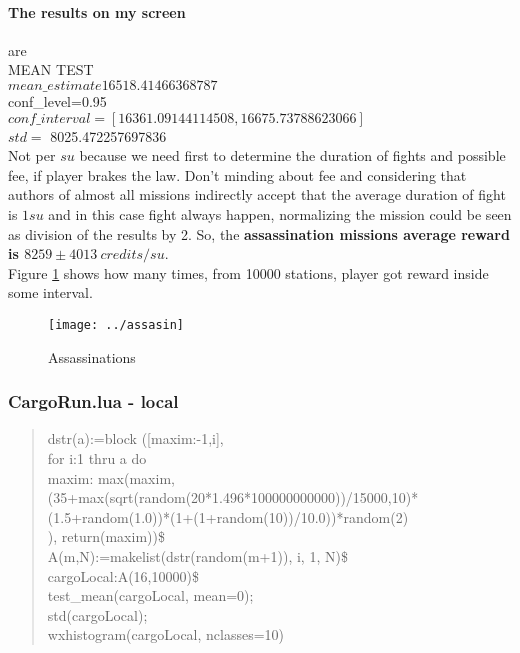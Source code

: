 \documentclass[]{article}
\begin{document}
\paragraph*{The results on my screen} are\\
MEAN TEST\\
$mean\_estimate16518.41466368787$\\
conf\_level=0.95\\
$conf\_interval=[16361.09144114508,16675.73788623066]$\\
$std=$ 8025.472257697836\\
 Not per $su$ because we need first to determine the duration of fights and possible fee, if player brakes the law. Don't minding about fee and considering that authors of almost all missions indirectly accept that the average duration of fight is $1su$ and in this case fight always happen, normalizing the mission could be seen as division of the results by 2. So, the \textbf{assassination missions average reward is $8259\pm4013\ credits/su.$}\\
Figure \ref{fig:assasin} shows how many times, from 10000 stations, player got reward inside some interval.\\ 
\begin{figure}[h]
	\centering
	\texttt{[image: ../assasin]}
	\caption{Assassinations}
	\label{fig:assasin}
\end{figure}
\subsubsection{CargoRun.lua - local}

\begin{quote}
dstr(a):=block ([maxim:-1,i],\\
\hspace*{10mm} for i:1 thru a do \\
\hspace*{20mm} maxim: max(maxim,\\
\hspace*{10mm}  (35+max(sqrt(random(20*1.496*100000000000))/15000,10)*\\
 \hspace*{30mm}(1.5+random(1.0))*(1+(1+random(10))/10.0))*random(2)\\
 ), return(maxim))\$\\
 
 A(m,N):=makelist(dstr(random(m+1)), i, 1, N)\$\\ 
 cargoLocal:A(16,10000)\$\\ 
 test\_mean(cargoLocal, mean=0);\\ 
 std(cargoLocal);\\ 
 wxhistogram(cargoLocal, nclasses=10)	
\end{quote}
\end{document}

